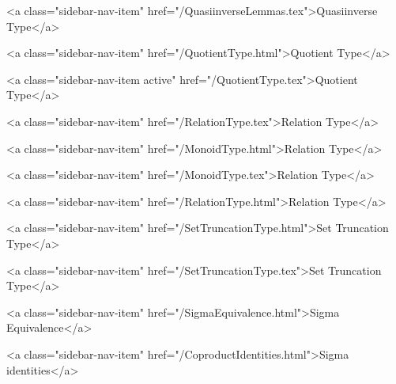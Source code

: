       
    
      
        
          <a class="sidebar-nav-item" href="/QuasiinverseLemmas.tex">Quasiinverse Type</a>
        
      
    
      
        
          <a class="sidebar-nav-item" href="/QuotientType.html">Quotient Type</a>
        
      
    
      
        
          <a class="sidebar-nav-item active" href="/QuotientType.tex">Quotient Type</a>
        
      
    
      
        
          <a class="sidebar-nav-item" href="/RelationType.tex">Relation Type</a>
        
      
    
      
        
          <a class="sidebar-nav-item" href="/MonoidType.html">Relation Type</a>
        
      
    
      
        
          <a class="sidebar-nav-item" href="/MonoidType.tex">Relation Type</a>
        
      
    
      
        
          <a class="sidebar-nav-item" href="/RelationType.html">Relation Type</a>
        
      
    
      
        
          <a class="sidebar-nav-item" href="/SetTruncationType.html">Set Truncation Type</a>
        
      
    
      
        
          <a class="sidebar-nav-item" href="/SetTruncationType.tex">Set Truncation Type</a>
        
      
    
      
        
          <a class="sidebar-nav-item" href="/SigmaEquivalence.html">Sigma Equivalence</a>
        
      
    
      
        
          <a class="sidebar-nav-item" href="/CoproductIdentities.html">Sigma identities</a>
        
